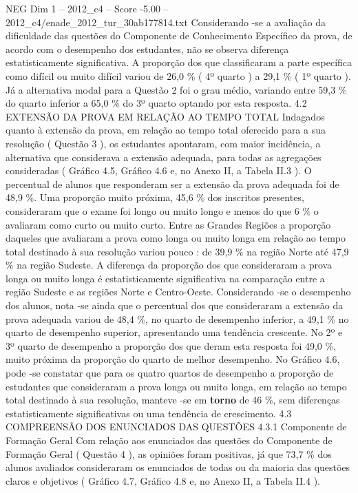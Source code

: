\begin{textsample}{NEG Dim 1 – 2012\_c4 – Score -5.00 – 2012\_c4/enade\_2012\_tur\_30ab177814.txt}
Considerando -se a avaliação da dificuldade das questões do Componente de Conhecimento Específico da prova, de acordo com o desempenho dos estudantes, não se observa diferença estatisticamente significativa.
A proporção dos que classificaram a parte específica como difícil ou muito difícil variou de 26,0 \% ( 4º quarto ) a 29,1 \% ( 1º quarto ).
Já a alternativa modal para a Questão 2 foi o grau médio, variando entre 59,3 \% do quarto inferior a 65,0 \% do 3º quarto optando por esta resposta. 4.2 EXTENSÃO DA PROVA EM RELAÇÃO AO TEMPO TOTAL Indagados quanto à extensão da prova, em relação ao tempo total oferecido para a sua resolução ( Questão 3 ), os estudantes apontaram, com maior incidência, a alternativa que considerava a extensão adequada, para todas as agregações consideradas ( Gráfico 4.5, Gráfico 4.6 e, no Anexo II, a Tabela II.3 ).
O percentual de alunos que responderam ser a extensão da prova adequada foi de 48,9 \%.
Uma proporção muito próxima, 45,6 \% dos inscritos presentes, consideraram que o exame foi longo ou muito longo e menos do que 6 \% o avaliaram como curto ou muito curto.
Entre as Grandes Regiões a proporção daqueles que avaliaram a prova como longa ou muito longa em relação ao tempo total destinado à sua resolução variou pouco : de 39,9 \% na região Norte até 47,9 \% na região Sudeste.
A diferença da proporção dos que consideraram a prova longa ou muito longa é estatisticamente significativa na comparação entre a região Sudeste e as regiões Norte e Centro-Oeste.
Considerando -se o desempenho dos alunos, nota -se ainda que o percentual dos que consideraram a extensão da prova adequada variou de 48,4 \%, no quarto de desempenho inferior, a 49,1 \% no quarto de desempenho superior, apresentando uma tendência crescente.
No 2º e 3º quarto de desempenho a proporção dos que deram esta resposta foi 49,0 \%, muito próxima da proporção do quarto de melhor desempenho.
No Gráfico 4.6, pode -se constatar que para os quatro quartos de desempenho a proporção de estudantes que consideraram a prova longa ou muito longa, em relação ao tempo total destinado à sua resolução, manteve -se em \textbf{torno} de 46 \%, sem diferenças estatisticamente significativas ou uma tendência de crescimento. 4.3 COMPREENSÃO DOS ENUNCIADOS DAS QUESTÕES 4.3.1 Componente de Formação Geral Com relação aos enunciados das questões do Componente de Formação Geral ( Questão 4 ), as opiniões foram positivas, já que 73,7 \% dos alunos avaliados consideraram os enunciados de todas ou da maioria das questões claros e objetivos ( Gráfico 4.7, Gráfico 4.8 e, no Anexo II, a Tabela II.4 ).

\end{textsample}
